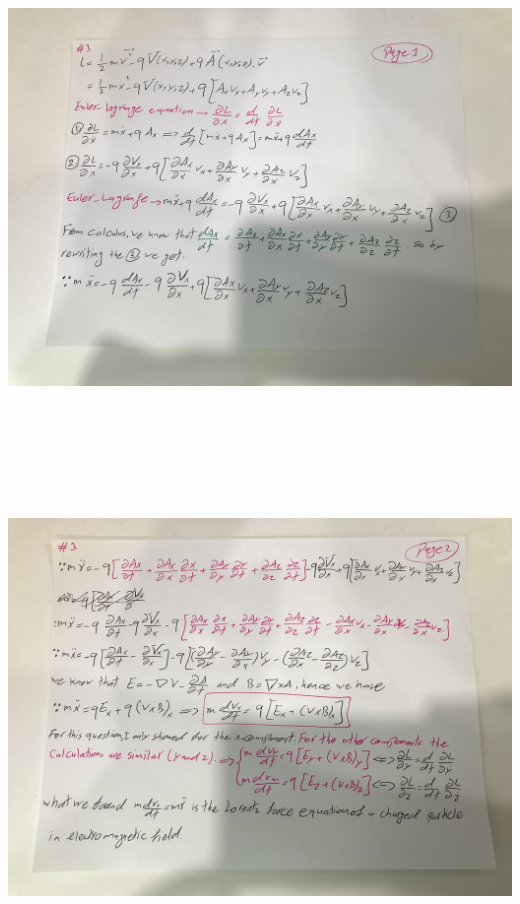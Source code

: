 \documentclass[fleqn]{article}
\begin{document}
\begin{enumerate}
    \includegraphics[height=13cm, width=15cm]{3A.jpg}

    \pagebreak

    \includegraphics[height=13cm, width=15cm]{3B.jpg}


\end{enumerate}
\end{document}
